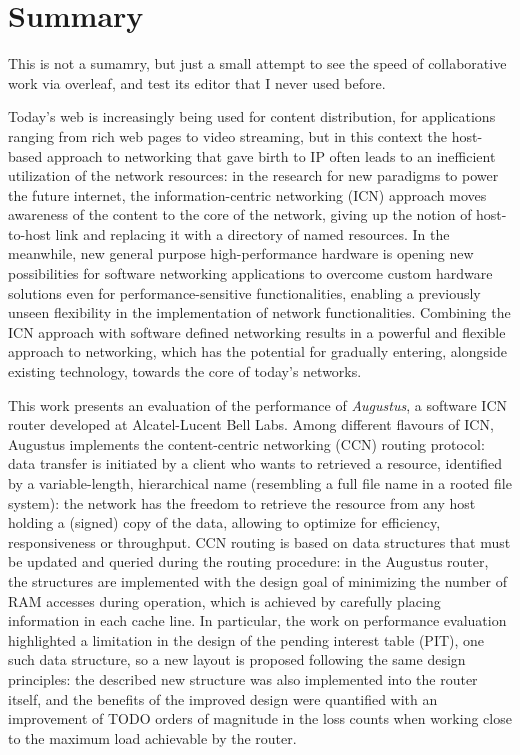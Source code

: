 \documentclass[11pt,a4paper,twoside,titlepage,openany]{book}
\begin{document}

\chapter*{Summary}
This is not a sumamry, but just a small attempt to see the speed of collaborative work via overleaf, and test its editor that I never used before. 

Today's web is increasingly being used for content distribution, for applications ranging from rich web pages to video streaming, but in this context the host-based approach to networking that gave birth to IP often leads to an inefficient utilization of the network resources: in the research for new paradigms to power the future internet, the information-centric networking (ICN) approach moves awareness of the content to the core of the network, giving up the notion of host-to-host link and replacing it with a directory of named resources.
In the meanwhile, new general purpose high-performance hardware is opening new possibilities for software networking applications to overcome custom hardware solutions even for performance-sensitive functionalities, enabling a previously unseen flexibility in the implementation of network functionalities.
Combining the ICN approach with software defined networking results in a powerful and flexible approach to networking, which has the potential for gradually entering, alongside existing technology, towards the core of today's networks.

This work presents an evaluation of the performance of \emph{Augustus}, a software ICN router developed at Alcatel-Lucent Bell Labs. Among different flavours of ICN, Augustus implements the content-centric networking (CCN) routing protocol: data transfer is initiated by a client who wants to retrieved a resource, identified by a variable-length, hierarchical name (resembling a full file name in a rooted file system): the network has the freedom to retrieve the resource from any host holding a (signed) copy of the data, allowing to optimize for efficiency, responsiveness or throughput. CCN routing is based on data structures that must be updated and queried during the routing procedure: in the Augustus router, the structures are implemented with the design goal of minimizing the number of RAM accesses during operation, which is achieved by carefully placing information in each cache line. In particular, the work on performance evaluation highlighted a limitation in the design of the pending interest table (PIT), one such data structure, so a new layout is proposed following the same design principles: the described new structure was also implemented into the router itself, and the benefits of the improved design were quantified with an improvement of TODO  orders of magnitude in the loss counts when working close to the maximum load achievable by the router.
\end{document}
